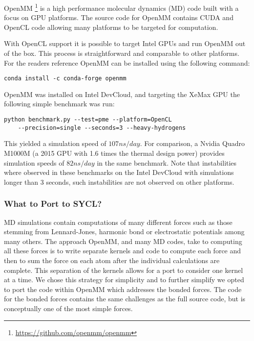 OpenMM \footnote{\url{https://github.com/openmm/openmm}} is a high performance molecular dynamics (MD) code built with a focus on GPU platforms. The source code for OpenMM contains CUDA and OpenCL code allowing many platforms to be targeted for computation.

With OpenCL support it is possible to target Intel GPUs and run OpenMM out of the box. This process is straightforward and comparable to other platforms. For the readers reference OpenMM can be installed using the following command:

\begin{lstlisting}
conda install -c conda-forge openmm
\end{lstlisting}

OpenMM was installed on Intel DevCloud, and targeting the XeMax GPU the following simple benchmark was run:

\begin{lstlisting}
python benchmark.py --test=pme --platform=OpenCL
    --precision=single --seconds=3 --heavy-hydrogens
\end{lstlisting}

This yielded a simulation speed of $107 ns/day$. For comparison, a Nvidia Quadro M1000M (a 2015 GPU with 1.6 times the thermal design power) provides simulation speeds of $82 ns/day$ in the same benchmark. Note that instabilities where observed in these benchmarks on the Intel DevCloud with simulations longer than 3 seconds, such instabilities are not observed on other platforms.

\subsubsection{What to Port to SYCL?}

MD simulations contain computations of many different forces such as those stemming from Lennard-Jones, harmonic bond or electrostatic potentials among many others. The approach OpenMM, and many MD codes, take to computing all these forces is to write separate kernels and code to compute each force and then to sum the force on each atom after the individual calculations are complete. This separation of the kernels allows for a port to consider one kernel at a time. We chose this strategy for simplicity and to further simplify we opted to port the code within OpenMM which addresses the bonded forces. The code for the bonded forces contains the same challenges as the full source code, but is conceptually one of the most simple forces.

